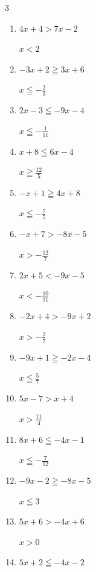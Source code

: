\begin{multicols}{3}
\begin{enumerate}
        $\displaystyle x<-\frac{1}{8}$

  \item $4x+4>7x-2$

        $\displaystyle x<2$

  \item $-3x+2\geqq 3x+6$

        $\displaystyle x\leqq -\frac{2}{3}$

  \item $2x-3\leqq -9x-4$

        $\displaystyle x\leqq -\frac{1}{11}$

  \item $x+8\leqq 6x-4$

        $\displaystyle x\geqq \frac{12}{5}$

  \item $-x+1\geqq 4x+8$

        $\displaystyle x\leqq -\frac{7}{5}$

  \item $-x+7>-8x-5$

        $\displaystyle x>-\frac{12}{7}$

  \item $2x+5<-9x-5$

        $\displaystyle x<-\frac{10}{11}$

  \item $-2x+4>-9x+2$

        $\displaystyle x>-\frac{2}{7}$

  \item $-9x+1\geqq -2x-4$

        $\displaystyle x\leqq \frac{5}{7}$

  \item $5x-7>x+4$

        $\displaystyle x>\frac{11}{4}$

  \item $8x+6\leqq -4x-1$

        $\displaystyle x\leqq -\frac{7}{12}$

\columnbreak %

\resetques

  \item $-9x-2\geqq -8x-5$

        $\displaystyle x\leqq 3$

  \item $5x+6>-4x+6$

        $\displaystyle x>0$

  \item $5x+2\leqq -4x-2$


\end{enumerate}
\end{multicols}
